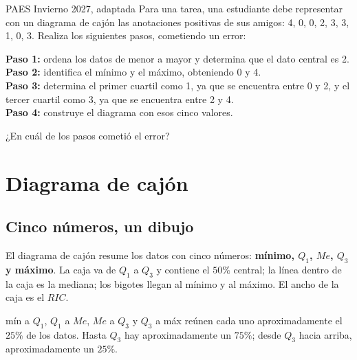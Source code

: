\begin{elejemplo}{PAES Invierno 2027, adaptada}
Para una tarea, una estudiante debe representar con un diagrama de cajón las anotaciones positivas de sus amigos: 4, 0, 0, 2, 3, 3, 1, 0, 3. Realiza los siguientes pasos, cometiendo un error:\par\smallskip
\textbf{Paso 1:} ordena los datos de menor a mayor y determina que el dato central es 2.\\
\textbf{Paso 2:} identifica el mínimo y el máximo, obteniendo 0 y 4.\\
\textbf{Paso 3:} determina el primer cuartil como 1, ya que se encuentra entre 0 y 2, y el tercer cuartil como 3, ya que se encuentra entre 2 y 4.\\
\textbf{Paso 4:} construye el diagrama con esos cinco valores.\par\smallskip
¿En cuál de los pasos cometió el error?
\end{elejemplo}

\section{Diagrama de cajón}

\subsection{Cinco números, un dibujo}
El diagrama de cajón resume los datos con cinco números: \textbf{mínimo, $Q_1$, $Me$, $Q_3$ y máximo}. La caja va de $Q_1$ a $Q_3$ y contiene el $50\%$ central; la línea dentro de la caja es la mediana; los bigotes llegan al mínimo y al máximo. El ancho de la caja es el $RIC$.

\begin{center}
\end{center}
\begin{clave} mín a $Q_1$, $Q_1$ a $Me$, $Me$ a $Q_3$ y $Q_3$ a máx reúnen cada uno aproximadamente el $25\%$ de los datos. Hasta $Q_3$ hay aproximadamente un $75\%$; desde $Q_3$ hacia arriba, aproximadamente un $25\%$.\end{clave}

